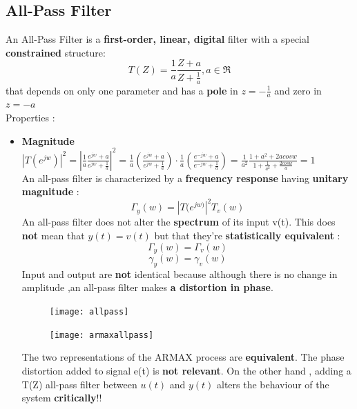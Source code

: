 \subsection{All-Pass Filter}
An All-Pass Filter is a \textbf{first-order, linear, digital} filter with a special \textbf{constrained} structure:\\
\[
\boxed{ T(Z) = \frac{1}{a}\frac{Z+a}{Z+\frac{1}{a}} ,a \in \Re} 
\]
that depends on only one parameter and has a \textbf{pole} in $z= -\frac{1}{a}$ and zero in $z= -a$\\
Properties :\\
\begin{itemize}
\item \textbf{Magnitude}\\
$ |T(e^{jw})|^2 = |\frac{1}{a}\frac{e^{jw}+a}{e^{jw}+\frac{1}{a}}|^2 = \frac{1}{a}(\frac{e^{jw}+a}{e^{jw}+\frac{1}{a}})\cdot  \frac{1}{a}(\frac{e^{-jw}+a}{e^{-jw}+\frac{1}{a}})  = \frac{1}{a^2} \frac{1+a^2+2acosw}{1+\frac{1}{a^2}+\frac{2cosw}{a}} = 1$\\
An all-pass filter is characterized by a \textbf{frequency response} having \textbf{unitary magnitude} :
$$ \Gamma_y(w)= |T(e^{jw)}|^2 T_v(w) $$
An all-pass filter does not alter the \textbf{spectrum} of its input v(t).
This does \textbf{not} mean that $y(t) = v(t) $ but that they're \textbf{statistically equivalent} :
\[
\boxed{\Gamma_y(w) = \Gamma_v(w)}
\]
\[
\boxed{\gamma_y(w) = \gamma_v(w)}
\]
Input and output are \textbf{not} identical because although there is no change in amplitude ,an all-pass filter makes \textbf{a distortion in phase}.
\begin{figure}[H]
 \centering
  \texttt{[image: allpass]}
\end{figure}
\begin{figure}[H]
 \centering
  \texttt{[image: armaxallpass]}
\end{figure}
The two representations of the ARMAX process are \textbf{equivalent}. The phase distortion added to signal e(t) is \textbf{not relevant}.
On the other hand , adding a T(Z) all-pass filter between $u(t)$ and $y(t)$ alters the behaviour of the system \textbf{critically}!!
\end{itemize}

